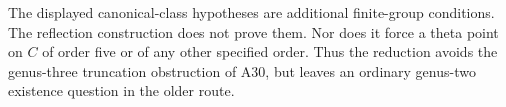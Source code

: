 The displayed canonical-class hypotheses are additional finite-group
conditions.  The reflection construction does not prove them.  Nor
does it force a theta point on $C$ of order five or of any other
specified order.  Thus the reduction avoids the genus-three
truncation obstruction of A30, but leaves an ordinary genus-two
existence question in the older route.

